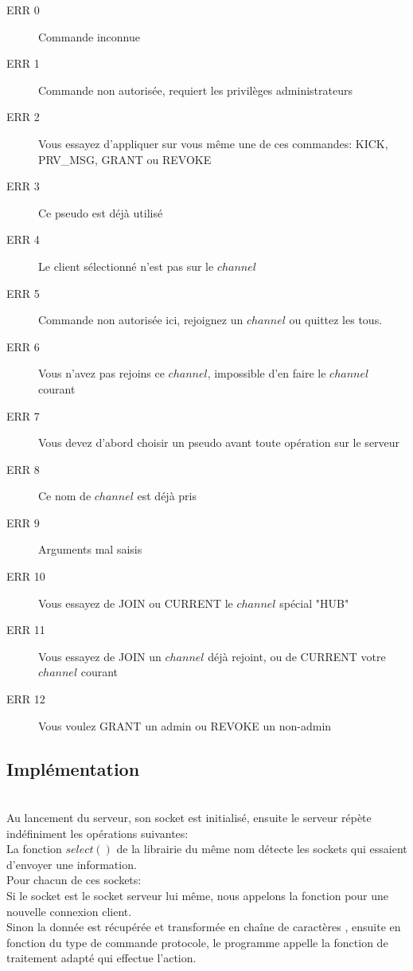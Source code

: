 \documentclass[12pt]{article}
\begin{document}

\begin{description}
    \item[ERR 0] Commande inconnue
    \item[ERR 1] Commande non autorisée, requiert les privilèges administrateurs
    \item[ERR 2] Vous essayez d'appliquer sur vous même une de ces commandes: KICK, PRV\_MSG, GRANT ou REVOKE
    \item[ERR 3] Ce pseudo est déjà utilisé
    \item[ERR 4] Le client sélectionné n'est pas sur le $channel$
    \item[ERR 5] Commande non autorisée ici, rejoignez un $channel$ ou quittez les tous. 
    \item[ERR 6] Vous n'avez pas rejoins ce $channel$, impossible d'en faire le $channel$ courant
    \item[ERR 7] Vous devez d'abord choisir un pseudo avant toute opération sur le serveur
    \item[ERR 8] Ce nom de $channel$ est déjà pris
    \item[ERR 9] Arguments mal saisis
    \item[ERR 10] Vous essayez de JOIN ou CURRENT le $channel$ spécial "HUB"
    \item[ERR 11] Vous essayez de JOIN un $channel$ déjà rejoint, ou de CURRENT votre $channel$ courant
    \item[ERR 12] Vous voulez GRANT un admin ou REVOKE un non-admin
\end{description}


\subsection{Implémentation}
\\Au lancement du serveur, son socket est initialisé, ensuite le serveur répète indéfiniment
les opérations suivantes:
\\La fonction $select()$ de la librairie du même nom détecte les sockets qui essaient d'envoyer
une information.
\\Pour chacun de ces sockets:
\\Si le socket est le socket serveur lui même, nous appelons la fonction pour une nouvelle connexion client.
\\Sinon la donnée est récupérée et transformée en chaîne de caractères
, ensuite en fonction du type de commande protocole, le programme appelle la fonction
de traitement adapté qui effectue l'action.
\\
\end{document}
